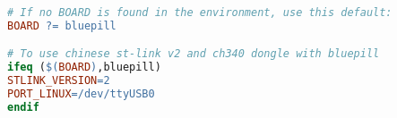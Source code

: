 \begin{lstlisting}[language=make]
# If no BOARD is found in the environment, use this default:
BOARD ?= bluepill

# To use chinese st-link v2 and ch340 dongle with bluepill
ifeq ($(BOARD),bluepill)
STLINK_VERSION=2
PORT_LINUX=/dev/ttyUSB0
endif
\end{lstlisting}
